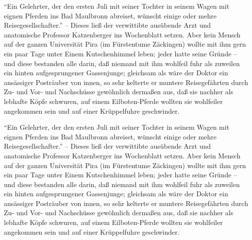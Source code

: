 \documentclass[11pt]{book}
\begin{document}
\beginnumbering
\pstart
``Ein Gelehrter, der den ersten Juli mit seiner Tochter in seinem Wagen mit eignen Pferden ins Bad Maulbronn abreiset, wünscht einige oder mehre Reisegesellschafter.'' -- Dieses ließ der verwittibte ausübende Arzt und anatomische Professor Katzenberger ins Wochenblatt setzen. Aber kein Mensch auf der ganzen Universität Pira (im Fürstentume Zäckingen) wollte mit ihm gern ein paar Tage unter Einem Kutschenhimmel leben; jeder hatte seine Gründe – und diese bestanden alle darin, daß niemand mit ihm wohlfeil fuhr als zuweilen ein hinten aufgesprungener Gassenjunge; gleichsam als wäre der Doktor ein ansässiger Posträuber von innen, so sehr kelterte er muntere Reisegefährten durch Zu- und Vor- und Nachschüsse gewöhnlich dermaßen aus, daß sie nachher als lebhafte Köpfe schwuren, auf einem Eilboten-Pferde wollten sie wohlfeiler angekommen sein und auf einer Krüppelfuhre geschwinder.
\pend
\endnumbering

``Ein Gelehrter, der den ersten Juli mit seiner Tochter in seinem Wagen mit eignen Pferden ins Bad Maulbronn abreiset, wünscht einige oder mehre Reisegesellschafter.'' -- Dieses ließ der verwittibte ausübende Arzt und anatomische Professor Katzenberger ins Wochenblatt setzen. Aber kein Mensch auf der ganzen Universität Pira (im Fürstentume Zäckingen) wollte mit ihm gern ein paar Tage unter Einem Kutschenhimmel leben; jeder hatte seine Gründe – und diese bestanden alle darin, daß niemand mit ihm wohlfeil fuhr als zuweilen ein hinten  aufgesprungener Gassenjunge; gleichsam als wäre der Doktor ein ansässiger Posträuber von innen, so sehr kelterte er muntere Reisegefährten durch Zu- und Vor- und Nachschüsse gewöhnlich dermaßen aus, daß sie nachher als lebhafte Köpfe schwuren, auf einem Eilboten-Pferde wollten sie wohlfeiler angekommen sein und auf einer Krüppelfuhre geschwinder.
\end{document}
